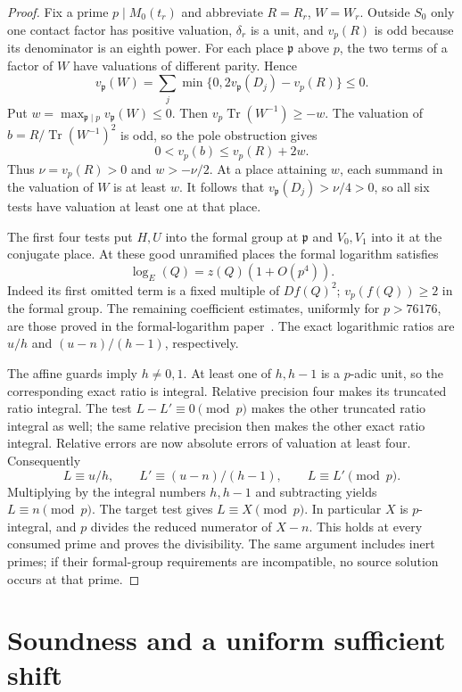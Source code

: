 \documentclass[11pt,a4paper]{article}
\DeclareMathOperator{\Tr}{Tr}\DeclareMathOperator{\rad}{rad}
\begin{document}
\begin{proof}
Fix a prime $p\mid M_0(t_r)$ and abbreviate $R=R_r$, $W=W_r$.
Outside $S_0$ only one contact factor has positive valuation,
$\delta_r$ is a unit, and $v_p(R)$ is odd because its denominator is an eighth power. For each place $\mathfrak p$ above $p$, the two terms
of a factor of $W$ have valuations of different parity. Hence
\[
 v_{\mathfrak p}(W)=\sum_j
       \min\{0,2v_{\mathfrak p}(D_j)-v_p(R)\}\le0.
\]
Put $w=\max_{\mathfrak p\mid p}v_{\mathfrak p}(W)\le0$.
Then $v_p\Tr(W^{-1})\ge-w$.
The valuation of $b=R/\Tr(W^{-1})^2$ is odd, so the pole
obstruction gives
\[
                   0<v_p(b)\le v_p(R)+2w.
\]
Thus $\nu=v_p(R)>0$ and $w>-\nu/2$. At a place attaining
$w$, each summand in the valuation of $W$ is at least $w$.
It follows that $v_{\mathfrak p}(D_j)>\nu/4>0$, so all
six tests have valuation at least one at that place.

The first four tests put $H,U$ into the formal group at
$\mathfrak p$ and $V_0,V_1$ into it at the conjugate place.
At these good unramified places the formal logarithm satisfies
\[
                         \log_E(Q)=z(Q)(1+O(p^4)).
\]
Indeed its first omitted term is a fixed multiple of $Df(Q)^2$;
$v_p(f(Q))\ge2$ in the formal group. The remaining coefficient
estimates, uniformly for $p>76176$, are those proved in the
formal-logarithm paper~\cite{Logs}. The exact logarithmic ratios
are $u/h$ and $(u-n)/(h-1)$, respectively.

The affine guards imply $h\ne0,1$. At least one of $h,h-1$
is a $p$-adic unit, so the corresponding exact ratio is integral.
Relative precision four makes its truncated ratio integral.
The test $L-L'\equiv0\pmod p$ makes the other truncated ratio
integral as well; the same relative precision then makes the
other exact ratio integral. Relative errors are now absolute
errors of valuation at least four. Consequently
\[
 L\equiv u/h,\qquad L'\equiv(u-n)/(h-1),\qquad
 L\equiv L'\pmod p.
\]
Multiplying by the integral numbers $h,h-1$ and subtracting yields
$L\equiv n\pmod p$. The target test gives $L\equiv X\pmod p$.
In particular $X$ is $p$-integral, and $p$ divides the
reduced numerator of $X-n$. This holds at every consumed
prime and proves the divisibility. The same argument includes
inert primes; if their formal-group requirements are incompatible,
no source solution occurs at that prime.
\end{proof}

\section{Soundness and a uniform sufficient shift}
\end{document}
